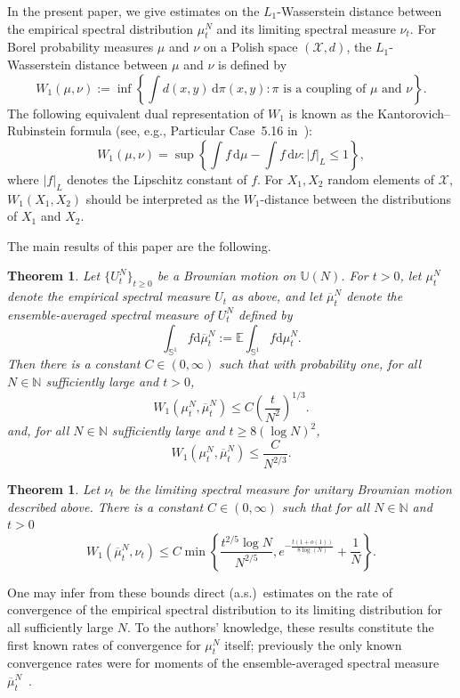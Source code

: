 \documentclass[11pt]{article}
\newtheorem{thm}[theo]{Theorem}
\theoremstyle{definition}
\numberwithin{equation}{section}
\numberwithin{figure}{section}
\numberwithin{table}{section}
\newcommand{\Circle}{\mathbb{S}^1}
\newcommand{\E}{\mathbb{E}}
\newcommand*{\dd}{\mathrm{d}}
\newcommand*{\dmu}{\dd \mu}
\newcommand*{\dbmu}{\dd \overline{\mu}}
\begin{document}
In the present paper, we give estimates on the $L_1$-Wasserstein distance between the empirical spectral distribution $\mu_t^N$ and its limiting spectral measure $\nu_t$. For Borel probability measures $\mu$ and $\nu$ on a Polish space $(\mathcal{X},d)$, the $L_1$-Wasserstein distance between $\mu$ and $\nu$ is defined by
\[
W_1(\mu,\nu):=\inf \left\{\int d(x,y)\,\dd\pi(x,y): \pi \text{ is a coupling of } \mu \text{ and } \nu\right\}.
\]
The following equivalent dual representation of $W_1$ is known as the Kantorovich--Rubinstein formula (see, e.g., Particular Case~5.16 in~\cite{Vil}):
\[
W_1(\mu,\nu) = \sup \left\{\int f\,\dmu -\int f\,\dd\nu : |f|_{L}\le1 \right\},
\]
where $|f|_L$ denotes the Lipschitz constant of $f$. For $X_1,X_2$ random elements of $\mathcal{X}$, $W_1(X_1,X_2)$ should be interpreted as the $W_1$-distance between the distributions of $X_1$ and $X_2$.


The main results of this paper are the following.

\begin{thm}\label{T:main}
Let $\{U^N_t\}_{t\ge0}$ be a Brownian motion on $\mathbb{U}(N)$. For $t>0$, let $\mu_t^N$ denote the empirical spectral measure $U_t$ as above, and let $\overline{\mu}_t^N$ denote the ensemble-averaged spectral measure of $U^N_t$ defined by
\[
\int_{\Circle}f\dbmu^N_t:=\E\int_{\Circle}f\dmu^N_t.
\]
Then there is a constant $C\in(0,\infty)$ such that with probability one, for all $N\in\mathbb{N}$ sufficiently large and $t>0$,
\[
W_1(\mu^N_{t},\overline{\mu}^N_{t})\le C\left(\frac{t}{N^2}\right)^{1/3}.
\]
and, for all $N\in\mathbb{N}$ sufficiently large and $t\ge 8(\log N)^2$,
\[
W_1(\mu^N_{t},\overline{\mu}^N_{t})\le \frac{C}{N^{2/3}}.
\]
\end{thm}


\begin{thm}\label{T:main-nu-t}
Let $\nu_t$ be the limiting spectral measure for unitary Brownian motion described above. There is a constant $C\in(0,\infty)$ such that for all $N\in\mathbb{N}$ and $t>0$
\[
W_1(\overline{\mu}_t^N,\nu_t)\le C\min\left\{\frac{t^{2/5}\log N}{N^{2/5}},e^{-\frac{t(1+o(1))}{8\log(N)}}+\frac{1}{N}\right\}.
\]
\end{thm} One may infer from these bounds direct (a.s.)~estimates on the rate of convergence of the empirical spectral distribution to its limiting distribution for all sufficiently large $N$. To the authors' knowledge, these results constitute the first known rates of convergence for $\mu_t^N$ itself; previously the only known convergence rates were for moments of the ensemble-averaged spectral measure $\overline{\mu}^N_t$~\cite{CDK2016}.
\end{document}
